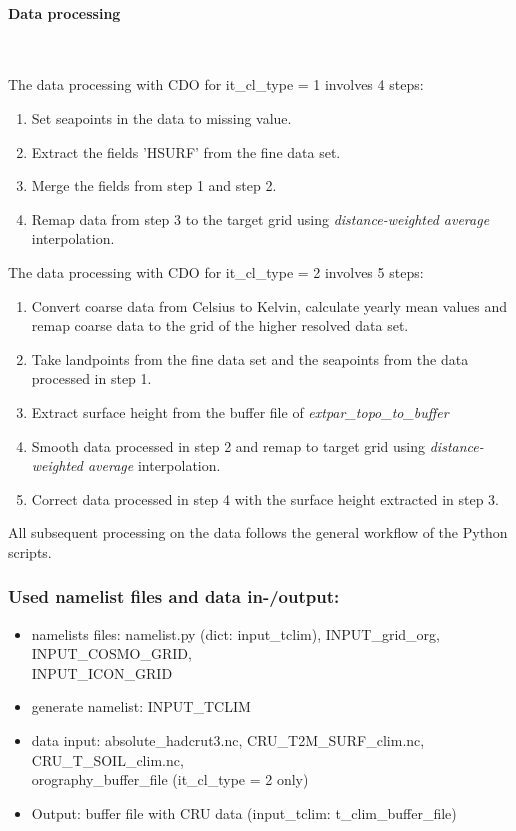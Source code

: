 \documentclass[a4paper,10pt,DIV14,BCOR1cm,titlepage,twoside]{scrartcl}
\begin{document}
\paragraph{Data processing} \ \par\medskip\noindent

\noindent The data processing with CDO for it\_cl\_type = 1 involves 4 steps:
\begin{enumerate}
  \item Set seapoints in the data to missing value.
  \item Extract the fields 'HSURF' from the fine data set.
  \item Merge the fields from step 1 and step 2.
  \item Remap data from step 3 to the target grid using \textit{distance-weighted average} interpolation. 
\end{enumerate}

\noindent The data processing with CDO for it\_cl\_type = 2 involves 5 steps:
\begin{enumerate}
  \item Convert coarse data from Celsius to Kelvin, calculate yearly mean values and remap coarse data to the grid of the higher resolved data set.
  \item Take landpoints from the fine data set and the seapoints from the data processed in step 1.
  \item Extract surface height from the buffer file of \textit{extpar\_topo\_to\_buffer}
  \item Smooth data processed in step 2 and remap to target grid using \textit{distance-weighted average} interpolation. 
  \item Correct data processed in step 4 with the surface height extracted in step 3.
\end{enumerate}

\noindent All subsequent processing on the data follows the general workflow of the Python scripts.

\subsubsection{Used namelist files and data in-/output:}
\begin{itemize}
 \item namelists files: namelist.py (dict: input\_tclim), INPUT\_grid\_org, INPUT\_COSMO\_GRID, \\
       INPUT\_ICON\_GRID
 \item generate namelist: INPUT\_TCLIM
 \item data input: absolute\_hadcrut3.nc, CRU\_T2M\_SURF\_clim.nc, CRU\_T\_SOIL\_clim.nc, \\
       orography\_buffer\_file (it\_cl\_type = 2 only)
 \item Output: buffer file with CRU data (input\_tclim: t\_clim\_buffer\_file)
\end{itemize}
\end{document}
